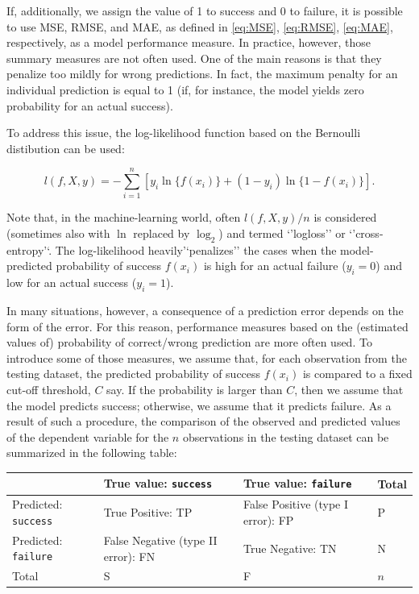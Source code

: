 \documentclass[12pt,]{krantz}
\begin{document}
If, additionally, we assign the value of 1 to success and 0 to failure, it is possible to use MSE, RMSE, and MAE, as defined in \eqref{eq:MSE}, \eqref{eq:RMSE}, \eqref{eq:MAE}, respectively, as a model performance measure. In practice, however, those summary measures are not often used. One of the main reasons is that they penalize too mildly for wrong predictions. In fact, the maximum penalty for an individual prediction is equal to 1 (if, for instance, the model yields zero probability for an actual success).

To address this issue, the log-likelihood function based on the Bernoulli distibution can be used:

\begin{equation}
l(f, X ,y) =  -\sum_{i=1}^{n} [y_i \ln\{f(x_i)\}+ (1-y_i) \ln\{1-f(x_i)\}].
\label{eq:bernoulli}
\end{equation}

Note that, in the machine-learning world, often \(l(f, X ,y)/n\) is considered (sometimes also with \(\ln\) replaced by \(\log_2\)) and termed `'logloss'' or `'cross-entropy'`. The log-likelihood heavily'`penalizes'' the cases when the model-predicted probability of success \(f(x_i)\) is high for an actual failure (\(y_i=0\)) and low for an actual success (\(y_i=1\)).

In many situations, however, a consequence of a prediction error depends on the form of the error. For this reason, performance measures based on the (estimated values of) probability of correct/wrong prediction are more often used. To introduce some of those measures, we assume that, for each observation from the testing dataset, the predicted probability of success \(f(x_i)\) is compared to a fixed cut-off threshold, \(C\) say. If the probability is larger than \(C\), then we assume that the model predicts success; otherwise, we assume that it predicts failure. As a result of such a procedure, the comparison of the observed and predicted values of the dependent variable for the \(n\) observations in the testing dataset can be summarized in the following table:

\begin{longtable}[]{@{}llll@{}}
\toprule
& True value: \texttt{success} & True value: \texttt{failure} & Total\tabularnewline
\midrule
\endhead
Predicted: \texttt{success} & True Positive: TP & False Positive (type I error): FP & P\tabularnewline
Predicted: \texttt{failure} & False Negative (type II error): FN & True Negative: TN & N\tabularnewline
Total & S & F & \(n\)\tabularnewline
\bottomrule
\end{longtable}
\end{document}

